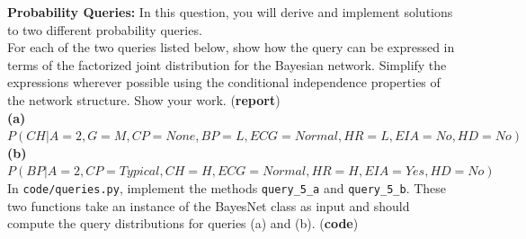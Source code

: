\documentclass[11pt]{article}
\begin{document}
\begin{problem}{10} \textbf{Probability Queries:} In this question, you will derive and implement solutions to two different
probability queries.\\
	
 For each of the two queries listed below, show how the query can be expressed in terms of the factorized joint distribution for the Bayesian network. Simplify the expressions wherever possible using the conditional independence properties of the network structure. Show your work. (\textbf{report})\\

\textbf{(a)} {\footnotesize $P(CH|A=2,G=M,CP=None,BP=L,ECG=Normal,HR=L,EIA=No,HD=No)$}\\
\textbf{(b)} {\footnotesize $P(BP|A=2,CP=Typical,CH=H,ECG=Normal,HR=H,EIA=Yes,HD=No)$}\\

 In \verb|code/queries.py|, implement the methods \verb|query_5_a| and \verb|query_5_b|. These two functions take an instance of the BayesNet class as input and should compute the query distributions for queries (a) and (b). (\textbf{code})

\end{problem}
\end{document}

